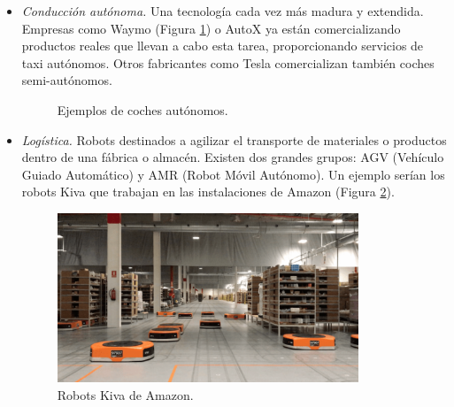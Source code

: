\begin{itemize}
\item \textit{Conducción autónoma.} Una tecnología cada vez más madura y extendida. Empresas como Waymo (Figura \ref{fig:coches_autonomos}) o AutoX ya están comercializando productos reales que llevan a cabo esta tarea, proporcionando servicios de taxi autónomos. Otros fabricantes como Tesla comercializan también coches semi-autónomos.\\

\begin{figure}[h!]
  \begin{center}
    \subcapcentertrue
    \hspace{2mm}
  \end{center}
\caption{Ejemplos de coches autónomos.}
\label{fig:coches_autonomos}
\end{figure}

\item \textit{Logística.} Robots destinados a agilizar el transporte de materiales o productos dentro de una fábrica o almacén. Existen dos grandes grupos: AGV (Vehículo Guiado Automático) y AMR (Robot Móvil Autónomo). Un ejemplo serían los robots Kiva que trabajan en las instalaciones de Amazon (Figura \ref{fig:kiva}).

\begin{figure} [h!]
  \begin{center}
    \includegraphics[width=90mm]{figs/amazon_kiva.png}
  \end{center}
  \caption{Robots Kiva de Amazon.}
  \label{fig:kiva}
\end{figure}


\end{itemize}
